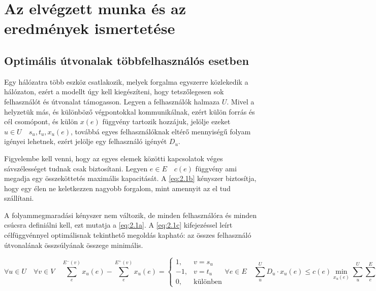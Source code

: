 \documentclass[a4paper,oneside]{article}
\newcommand{\inedge}[1]{E^-(#1)}
\newcommand{\outedge}[1]{E^+(#1)}
\begin{document}
\section{Az elvégzett munka és az eredmények ismertetése}
\label{sec:az-elvegzett-munka}

\subsection{Optimális útvonalak többfelhasználós esetben}
\label{sec:multiuser}

Egy hálózatra több eszköz csatlakozik, melyek forgalma egyszerre közlekedik a hálózaton, ezért
a modellt úgy kell kiegészíteni, hogy tetszőlegesen sok felhasználót és útvonalat támogasson.
Legyen a felhasználók halmaza $U$.
Mivel a helyzetük más, és különböző végpontokkal kommunikálnak, ezért külön forrás és cél csomópont, 
és külön $x(e)$ függvény tartozik hozzájuk, jelölje ezeket $u \in U \quad s_u, t_u, x_u(e)$,
továbbá egyes felhasználóknak eltérő mennyiségű folyam igényei lehetnek,
ezért jelölje egy felhasználó igényét $D_u$.

Figyelembe kell venni, hogy az egyes elemek közötti kapcsolatok véges sávszélességet tudnak csak biztosítani.
Legyen $e \in E \quad c(e)$ függvény ami megadja egy összeköttetés maximális kapacitását.
A \eqref{eq:2.1b} kényszer biztosítja, hogy egy élen ne keletkezzen nagyobb forgalom, mint amennyit az el tud szállítani.

A folyammegmaradási kényszer nem változik, de minden felhasználóra és minden csúcsra definiálni kell, ezt mutatja a \eqref{eq:2.1a}.
A \eqref{eq:2.1c} kifejezéssel leírt célfüggvénnyel optimálisnak tekinthető megoldás kapható:
az összes felhasználó útvonalának összsúlyának összege minimális.

\begin{subequations}
  \begin{equation}
    \forall u \in U \quad \forall v \in V \quad \sum_{e}^{\inedge{v}}x_u(e) - \sum_{e}^{\outedge{v}}x_u(e) = \begin{cases}
      1, & v = s_u \\
      -1, & v = t_u\\
      0, & \text{különben}
    \end{cases} \label{eq:2.1a}
  \end{equation}
  \begin{equation}
    \forall e \in E \quad \sum_{u}^{U} D_u \cdot x_u(e) \leq c(e) \label{eq:2.1b}
  \end{equation}
  \begin{equation}
    \min_{x_u(e)} \sum_{u}^{U} \sum_{e}^{E} x_u(e) \, w(e) \label{eq:2.1c}
  \end{equation}
\end{subequations}
\end{document}
